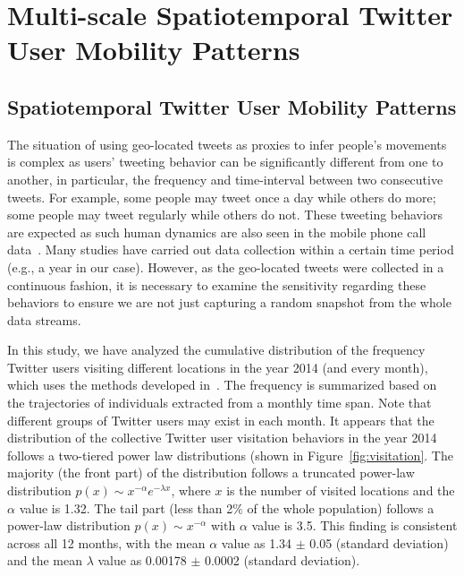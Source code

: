 \documentclass[ijgi,article,accept,moreauthors,pdftex,10pt,a4paper]{mdpi}
\theoremstyle{mdpi}
\newcounter{ex}
\newcounter{re}
\theoremstyle{mdpidefinition}
\begin{document}
\section{Multi-scale Spatiotemporal Twitter User Mobility Patterns}
\subsection{Spatiotemporal Twitter User Mobility Patterns}
The situation of using geo-located tweets as proxies to infer people's movements is complex as users' tweeting behavior can be significantly different from one to another, in particular, the frequency and time-interval between two consecutive tweets.
For example, some people may tweet once a day while others do more; some people may tweet regularly while others do not.  
These tweeting behaviors are expected as such human dynamics are also seen in the mobile phone call data~\cite{gonzalez2008understanding}. 
Many studies have carried out data collection within a certain time period (e.g., a year in our case).
However, as the geo-located tweets were collected in a continuous fashion, it is necessary to examine the sensitivity regarding these behaviors to ensure we are not just capturing a random snapshot from the whole data streams. 

In this study, we have analyzed the cumulative distribution of the frequency Twitter users visiting different locations in the year 2014 (and every month), which uses the methods developed in~\cite{clauset2009power}. 
The frequency is summarized based on the trajectories of individuals extracted from a monthly time span.
Note that different groups of Twitter users may exist in each month. 
It appears that the distribution of the collective Twitter user visitation behaviors in the year 2014 follows a two-tiered power law distributions (shown in Figure~\ref{fig:visitation}.
The majority (the front part) of the distribution follows a truncated power-law distribution $p(x)\sim x^{-\alpha}e^{-\lambda x}$, where $x$ is the number of visited locations and the $\alpha$ value is 1.32.
The tail part (less than 2$\%$ of the whole population) follows a power-law distribution  $p(x)\sim x^{-\alpha}$ with $\alpha$ value is 3.5.
This finding is consistent across all 12 months, with the mean $\alpha$ value as 1.34 $ \pm$  0.05 (standard deviation) and the mean $\lambda$ value as 0.00178 $ \pm$  0.0002 (standard deviation).
\end{document}

